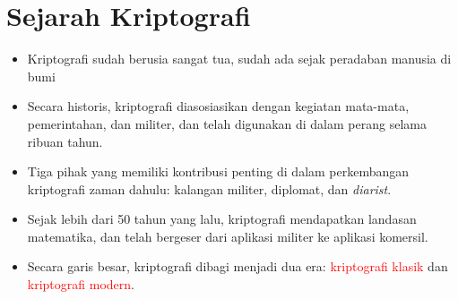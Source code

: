 \documentclass{article}
\begin{document}

\section*{Sejarah Kriptografi}

\begin{itemize}
    \item Kriptografi sudah berusia sangat tua, sudah ada sejak peradaban manusia di bumi
    \item Secara historis, kriptografi diasosiasikan dengan kegiatan mata-mata, pemerintahan, dan militer, dan telah digunakan di dalam perang selama ribuan tahun.
    \item Tiga pihak yang memiliki kontribusi penting di dalam perkembangan kriptografi zaman dahulu: kalangan militer, diplomat, dan \textit{diarist}.
    \item Sejak lebih dari 50 tahun yang lalu, kriptografi mendapatkan landasan matematika, dan telah bergeser dari aplikasi militer ke aplikasi komersil.
    \item Secara garis besar, kriptografi dibagi menjadi dua era: \textcolor{red}{kriptografi klasik} dan \textcolor{red}{kriptografi modern}.
\end{itemize}
\end{document}
